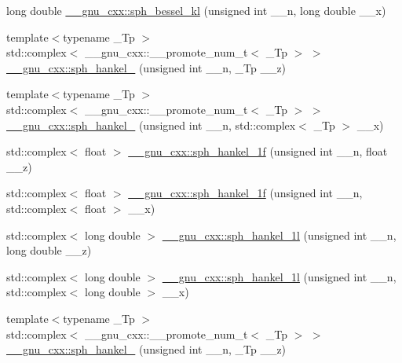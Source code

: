 \begin{DoxyCompactItemize}
\item 
long double \hyperlink{group__gnu__math__spec__func_ga22f6a73e50e7020a7c2fa64ce1b9be41}{\+\_\+\+\_\+gnu\+\_\+cxx\+::sph\+\_\+bessel\+\_\+kl} (unsigned int \+\_\+\+\_\+n, long double \+\_\+\+\_\+x)
\item 
{\footnotesize template$<$typename \+\_\+\+Tp $>$ }\\std\+::complex$<$ \+\_\+\+\_\+gnu\+\_\+cxx\+::\+\_\+\+\_\+promote\+\_\+num\+\_\+t$<$ \+\_\+\+Tp $>$ $>$ \hyperlink{group__gnu__math__spec__func_ga9440f3f92ebc56bd77d64853390247f6}{\+\_\+\+\_\+gnu\+\_\+cxx\+::sph\+\_\+hankel\+\_} (unsigned int \+\_\+\+\_\+n, \+\_\+\+Tp \+\_\+\+\_\+z)
\item 
{\footnotesize template$<$typename \+\_\+\+Tp $>$ }\\std\+::complex$<$ \+\_\+\+\_\+gnu\+\_\+cxx\+::\+\_\+\+\_\+promote\+\_\+num\+\_\+t$<$ \+\_\+\+Tp $>$ $>$ \hyperlink{group__gnu__math__spec__func_ga0bf6e485b5ec9d1ae4ab604137216d70}{\+\_\+\+\_\+gnu\+\_\+cxx\+::sph\+\_\+hankel\+\_} (unsigned int \+\_\+\+\_\+n, std\+::complex$<$ \+\_\+\+Tp $>$ \+\_\+\+\_\+x)
\item 
std\+::complex$<$ float $>$ \hyperlink{group__gnu__math__spec__func_ga70d4fc01069f3f0ac0e3b52fe1dffea4}{\+\_\+\+\_\+gnu\+\_\+cxx\+::sph\+\_\+hankel\+\_\+1f} (unsigned int \+\_\+\+\_\+n, float \+\_\+\+\_\+z)
\item 
std\+::complex$<$ float $>$ \hyperlink{group__gnu__math__spec__func_gadbb875cd50abb62ac75386143486bb2c}{\+\_\+\+\_\+gnu\+\_\+cxx\+::sph\+\_\+hankel\+\_\+1f} (unsigned int \+\_\+\+\_\+n, std\+::complex$<$ float $>$ \+\_\+\+\_\+x)
\item 
std\+::complex$<$ long double $>$ \hyperlink{group__gnu__math__spec__func_ga6e77fd5cddfbd57d9120b20fc6c30e6f}{\+\_\+\+\_\+gnu\+\_\+cxx\+::sph\+\_\+hankel\+\_\+1l} (unsigned int \+\_\+\+\_\+n, long double \+\_\+\+\_\+z)
\item 
std\+::complex$<$ long double $>$ \hyperlink{group__gnu__math__spec__func_ga3e9d889d8f2e4792e892b12b1f5948b9}{\+\_\+\+\_\+gnu\+\_\+cxx\+::sph\+\_\+hankel\+\_\+1l} (unsigned int \+\_\+\+\_\+n, std\+::complex$<$ long double $>$ \+\_\+\+\_\+x)
\item 
{\footnotesize template$<$typename \+\_\+\+Tp $>$ }\\std\+::complex$<$ \+\_\+\+\_\+gnu\+\_\+cxx\+::\+\_\+\+\_\+promote\+\_\+num\+\_\+t$<$ \+\_\+\+Tp $>$ $>$ \hyperlink{group__gnu__math__spec__func_ga4f112ebd12bfbea7f0eea9275a1209ac}{\+\_\+\+\_\+gnu\+\_\+cxx\+::sph\+\_\+hankel\+\_} (unsigned int \+\_\+\+\_\+n, \+\_\+\+Tp \+\_\+\+\_\+z)

\end{DoxyCompactItemize}
